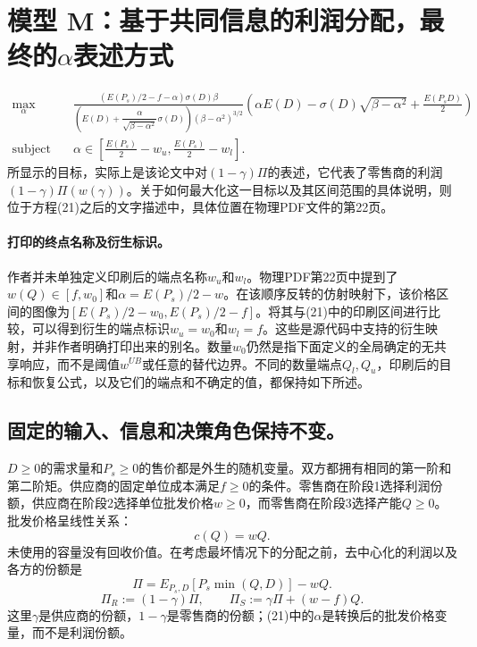 \documentclass{article}
\begin{document}
\section*{模型 M：基于共同信息的利润分配，最终的$\alpha$表述方式}

\begin{equation}
\begin{aligned}
\max_{\alpha}\quad &
\frac{(E(P_s)/2-f-\alpha)\sigma(D)\beta}
{\left(E(D)+\dfrac{\alpha}{\sqrt{\beta-\alpha^2}}\sigma(D)\right)(\beta-\alpha^2)^{3/2}}
\left(\alpha E(D)-\sigma(D)\sqrt{\beta-\alpha^2}+\frac{E(P_sD)}{2}\right)\\
\text{subject to}\quad &
\alpha\in\left[\frac{E(P_s)}{2}-w_u,\frac{E(P_s)}{2}-w_l\right].
\end{aligned}
\tag{21}
\end{equation}
所显示的目标，实际上是该论文中对$(1-\gamma)\Pi$的表述，它代表了零售商的利润$(1-\gamma)\Pi(w(\gamma))$。关于如何最大化这一目标以及其区间范围的具体说明，则位于方程(21)之后的文字描述中，具体位置在物理PDF文件的第22页。

\paragraph{打印的终点名称及衍生标识。}
作者并未单独定义印刷后的端点名称$w_u$和$w_l$。物理PDF第22页中提到了$w(Q)\in[f,w_0]$和$\alpha=E(P_s)/2-w$。在该顺序反转的仿射映射下，该价格区间的图像为$[E(P_s)/2-w_0,E(P_s)/2-f]$。将其与(21)中的印刷区间进行比较，可以得到衍生的端点标识$w_u=w_0$和$w_l=f$。这些是源代码中支持的衍生映射，并非作者明确打印出来的别名。数量$w_0$仍然是指下面定义的全局确定的无共享响应，而不是阈值$w^{UB}$或任意的替代边界。不同的数量端点$Q_l,Q_u$，印刷后的目标和恢复公式，以及它们的端点和不确定的值，都保持如下所述。

\subsection*{固定的输入、信息和决策角色保持不变。}
$D\geq0$的需求量和$P_s\geq0$的售价都是外生的随机变量。双方都拥有相同的第一阶和第二阶矩。供应商的固定单位成本满足$f\geq0$的条件。零售商在阶段1选择利润份额，供应商在阶段2选择单位批发价格$w\geq0$，而零售商在阶段3选择产能$Q\geq0$。批发价格呈线性关系：
\[
c(Q)=wQ.
\]
未使用的容量没有回收价值。在考虑最坏情况下的分配之前，去中心化的利润以及各方的份额是
\begin{equation}
\Pi=E_{P_s,D}\!\left[P_s\min(Q,D)\right]-wQ.
\tag{2}
\end{equation}
\[
\Pi_R:=(1-\gamma)\Pi,\qquad
\Pi_S:=\gamma\Pi+(w-f)Q.
\]
这里$\gamma$是供应商的份额，$1-\gamma$是零售商的份额；(21)中的$\alpha$是转换后的批发价格变量，而不是利润份额。
\end{document}

